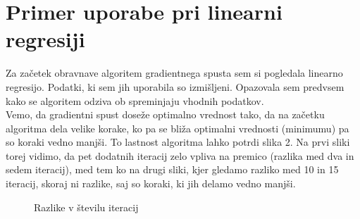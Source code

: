 \documentclass{article}
\begin{document}
\newpage
\section{Primer uporabe pri linearni regresiji}
Za začetek obravnave algoritem gradientnega spusta sem si pogledala linearno regresijo. Podatki, ki sem jih uporabila so izmišljeni. Opazovala sem predvsem kako se algoritem odziva ob spreminjaju vhodnih podatkov.\\

\noindent Vemo, da gradientni spust doseže optimalno vrednost tako, da na začetku algoritma dela velike korake, ko pa se bliža optimalni vrednosti (minimumu) pa so koraki vedno manjši. To lastnost algoritma lahko potrdi slika 2. Na prvi sliki torej vidimo, da pet dodatnih iteracij zelo vpliva na premico (razlika med dva in sedem  iteracij), med tem ko na drugi sliki, kjer gledamo razliko med 10 in 15 iteracij, skoraj ni razlike, saj so koraki, ki jih delamo vedno manjši. \\

\begin{figure}[h]
    \centering
    \caption{Razlike v številu iteracij}
    \label{fig:foobar}
\end{figure}
\end{document}
